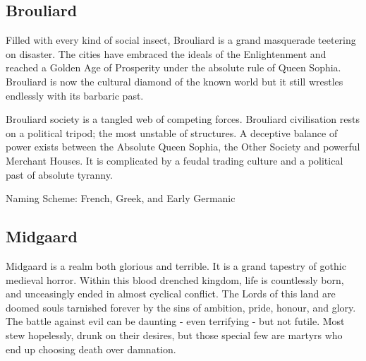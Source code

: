 \begin{multicols}{2}
\subsection{Brouliard} 

Filled with every kind of social insect, Brouliard is a grand masquerade teetering on disaster. The cities have embraced the ideals of the Enlightenment and reached a Golden Age of Prosperity under the absolute rule of Queen Sophia. Brouliard is now the cultural diamond of the known world but it still wrestles endlessly with its barbaric past.

Brouliard society is a tangled web of competing forces. Brouliard civilisation rests on a political tripod; the most unstable of structures. A deceptive balance of power exists between the Absolute Queen Sophia, the Other Society and powerful Merchant Houses. It is complicated by a feudal trading culture and a political past of absolute tyranny. 

Naming Scheme: French, Greek, and Early Germanic






\subsection{Midgaard} 

Midgaard is a realm both glorious and terrible. It is a grand tapestry of gothic medieval horror. Within this blood drenched kingdom, life is countlessly born, and unceasingly ended in almost cyclical conflict. The Lords of this land are doomed souls tarnished forever by the sins of ambition, pride, honour, and glory. The battle against evil can be daunting - even terrifying - but not futile. Most stew hopelessly, drunk on their desires, but those special few are martyrs who end up choosing death over damnation.


\end{multicols}
